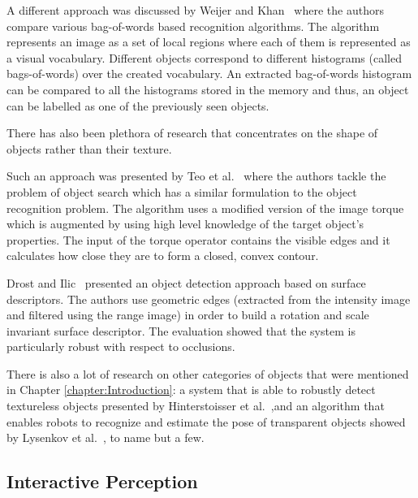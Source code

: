 A different approach was discussed by Weijer and Khan~\cite{van2013fusing} where the authors compare various bag-of-words based recognition algorithms. The algorithm represents an image as a set of local regions where each of them is represented as a visual vocabulary. Different objects correspond to different histograms (called bags-of-words) over the created vocabulary. An extracted bag-of-words histogram can be compared to all the histograms stored in the memory and thus, an object can be labelled as one of the previously seen objects. 

There has also been plethora of research that concentrates on the shape of objects rather than their texture. 

Such an approach was presented by Teo et al.~\cite{teoembedding} where the authors tackle the problem of object search which has a similar formulation to the object recognition problem. The algorithm uses a modified version of the image torque~\cite{nishigaki2012image} which is augmented by using high level knowledge of the target object's properties. The input of the torque operator contains the visible edges and it calculates how close they are to form a closed, convex contour.

Drost and Ilic~\cite{drost20123d} presented an object detection approach based on surface descriptors. The authors use geometric edges (extracted from the intensity image and filtered using the range image) in order to build a rotation and scale invariant surface descriptor. The evaluation showed that the system is particularly robust with respect to occlusions.  

There is also a lot of research on other categories of objects that were mentioned in Chapter \ref{chapter:Introduction}: a system that is able to robustly detect textureless objects presented by Hinterstoisser et al.~\cite{hinterstoisser2011multimodal},and an algorithm that enables robots to recognize and estimate the pose of transparent objects showed by Lysenkov et al.~\cite{lysenkov2012recognition}, to name but a few. 

\newpage

\subsection{Interactive Perception}



